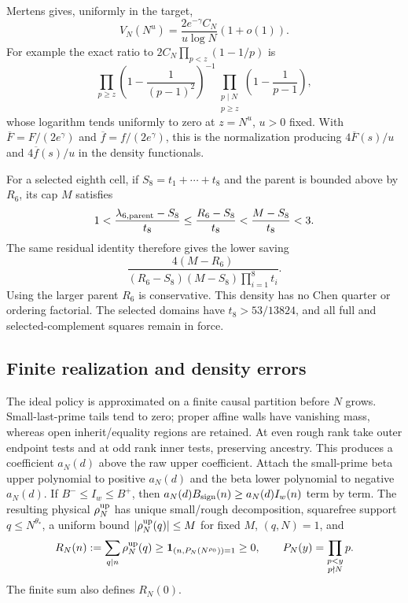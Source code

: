 Mertens gives, uniformly in the target,
\begin{equation}
 V_N(N^u)=\frac{2e^{-\gamma}C_N}{u\log N}(1+o(1)).
 \label{eq:current-mertens}
\end{equation}
For example the exact ratio to $2C_N\prod_{p<z}(1-1/p)$ is
\[
 \prod_{p\ge z}\left(1-\frac1{(p-1)^2}\right)^{-1}
 \prod_{\substack{p\mid N\\p\ge z}}\left(1-\frac1{p-1}\right),
\]
whose logarithm tends uniformly to zero at $z=N^u$, $u>0$ fixed.
With $\overline F=F/(2e^\gamma)$ and
$\overline f=f/(2e^\gamma)$, this is the normalization producing
$4\overline F(s)/u$ and $4\overline f(s)/u$ in the density functionals.

For a selected eighth cell, if $S_8=t_1+\cdots+t_8$ and the parent is bounded above by $R_6$, its cap $M$ satisfies
\[
 1<\frac{\lambda_{6,\rm parent}-S_8}{t_8}
  \le\frac{R_6-S_8}{t_8}<\frac{M-S_8}{t_8}<3.
\]
The same residual identity therefore gives the lower saving
\begin{equation}
 \frac{4(M-R_6)}{(R_6-S_8)(M-S_8)\prod_{i=1}^8t_i}.
 \label{eq:current-eighth-saving}
\end{equation}
Using the larger parent $R_6$ is conservative.  This density has no
Chen quarter or ordering factorial.  The selected domains have
$t_8>53/13824$, and all full and selected-complement squares remain
in force.

\subsection{Finite realization and density errors}

The ideal policy is approximated on a finite causal partition before
$N$ grows.  Small-last-prime tails tend to zero; proper affine walls
have vanishing mass, whereas open inherit/equality regions are
retained.  At even rough rank take outer endpoint tests and at odd
rank inner tests, preserving ancestry.  This produces a coefficient
$a_N(d)$ above the raw upper coefficient.  Attach the small-prime
beta upper polynomial to positive $a_N(d)$ and the beta lower
polynomial to negative $a_N(d)$.  If $B^-\le I_w\le B^+$, then
$a_N(d)B_{\rm sign}(n)\ge a_N(d)I_w(n)$ term by term.
The resulting physical $\rho_N^{\rm up}$ has unique small/rough decomposition,
squarefree support $q\le N^{\theta_*}$, a uniform bound
$|\rho_N^{\rm up}(q)|\le M$ for fixed $M$, $(q,N)=1$, and
\begin{equation}
 R_N(n):=\sum_{q\mid n}\rho_N^{\rm up}(q)
   \ge {\mathbf 1}_{(n,P_N(N^{\rho_0}))=1}\ge0,
 \qquad P_N(y)=\prod_{\substack{p<y\\p\nmid N}}p.
 \label{eq:current-physical-upper}
\end{equation}
The finite sum also defines $R_N(0)$.

